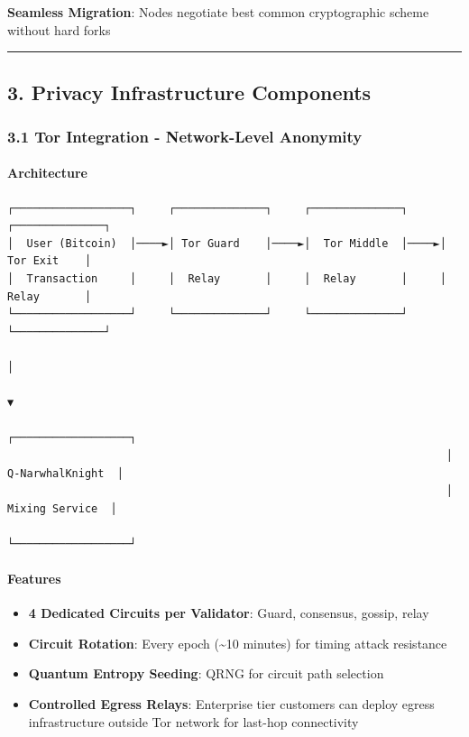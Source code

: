 \documentclass[
  11pt,
]{article}
\providecommand{\tightlist}{%
  \setlength{\itemsep}{0pt}\setlength{\parskip}{0pt}}
\begin{document}
\textbf{Seamless Migration}: Nodes negotiate best common cryptographic
scheme without hard forks

\begin{center}\rule{0.5\linewidth}{0.5pt}\end{center}

\hypertarget{privacy-infrastructure-components}{%
\subsection{3. Privacy Infrastructure
Components}\label{privacy-infrastructure-components}}

\hypertarget{tor-integration---network-level-anonymity}{%
\subsubsection{3.1 Tor Integration - Network-Level
Anonymity}\label{tor-integration---network-level-anonymity}}

\hypertarget{architecture}{%
\paragraph{Architecture}\label{architecture}}

\begin{verbatim}
┌──────────────────┐     ┌──────────────┐     ┌──────────────┐     ┌──────────────┐
│  User (Bitcoin)  │────►│ Tor Guard    │────►│  Tor Middle  │────►│  Tor Exit    │
│  Transaction     │     │  Relay       │     │  Relay       │     │  Relay       │
└──────────────────┘     └──────────────┘     └──────────────┘     └──────────────┘
                                                                             │
                                                                             ▼
                                                                    ┌──────────────────┐
                                                                    │ Q-NarwhalKnight  │
                                                                    │  Mixing Service  │
                                                                    └──────────────────┘
\end{verbatim}

\hypertarget{features}{%
\paragraph{Features}\label{features}}

\begin{itemize}
\tightlist
\item
  \textbf{4 Dedicated Circuits per Validator}: Guard, consensus, gossip,
  relay
\item
  \textbf{Circuit Rotation}: Every epoch (\textasciitilde10 minutes) for
  timing attack resistance
\item
  \textbf{Quantum Entropy Seeding}: QRNG for circuit path selection
\item
  \textbf{Controlled Egress Relays}: Enterprise tier customers can
  deploy egress infrastructure outside Tor network for last-hop
  connectivity
\end{itemize}
\end{document}
